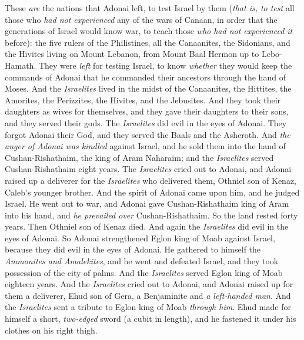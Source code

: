 \begin{biblechapter} %
 These \textit{are} the nations that Adonai left, to test Israel by them (\textit{that is, to test} all those who \textit{had not experienced} any of the wars of Canaan,
\verse in order that the generations of Israel would know war, to teach those \textit{who had not experienced it} before):
\verse the five rulers of the Philistines, all the Canaanites, the Sidonians, and the Hivites living on Mount Lebanon, from Mount Baal Hermon up to Lebo-Hamath.
\verse They were \textit{left} for testing Israel, to know \textit{whether} they would keep the commands of Adonai that he commanded their ancestors through the hand of Moses.
\verse And the \textit{Israelites} lived in the midst of the Canaanites, the Hittites, the Amorites, the Perizzites, the Hivites, and the Jebusites.
\verse And they took their daughters as wives for themselves, and they gave their daughters to their sons, and they served their gods.
 The \textit{Israelites} did evil in the eyes of Adonai. They forgot Adonai their God, and they served the Baals and the Asheroth.
\verse And \textit{the anger of Adonai was kindled} against Israel, and he sold them into the hand of Cushan-Rishathaim, the king of Aram Naharaim; and the \textit{Israelites} served Cushan-Rishathaim eight years.
\verse The \textit{Israelites} cried out to Adonai, and Adonai raised up a deliverer for the \textit{Israelites} who delivered them, Othniel son of Kenaz, Caleb’s younger brother.
\verse And the spirit of Adonai came upon him, and he judged Israel. He went out to war, and Adonai gave Cushan-Rishathaim king of Aram into his hand, and \textit{he prevailed over} Cushan-Rishathaim.
\verse So the land rested forty years. Then Othniel son of Kenaz died.
 And again the \textit{Israelites} did evil in the eyes of Adonai. So Adonai strengthened Eglon king of Moab against Israel, because they did evil in the eyes of Adonai.
\verse He gathered to himself the \textit{Ammonites and Amalekites}, and he went and defeated Israel, and they took possession of the city of palms.
\verse And the \textit{Israelites} served Eglon king of Moab eighteen years.
\verse And the \textit{Israelites} cried out to Adonai, and Adonai raised up for them a deliverer, Ehud son of Gera, a Benjaminite and \textit{a left-handed man}. And the \textit{Israelites} sent a tribute to Eglon king of Moab \textit{through him}.
\verse Ehud made for himself a short, \textit{two-edged} sword (a cubit in length), and he fastened it under his clothes on his right thigh.

\end{biblechapter}
